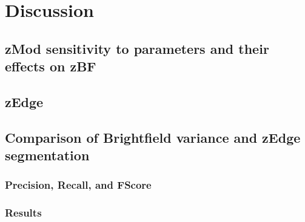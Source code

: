 
\chapter{Discussion}

\ifpdf
    \graphicspath{{Chapter6/Figs/Raster/}{Chapter6/Figs/PDF/}{Chapter6/Figs/}}
\else
    \graphicspath{{Chapter6/Figs/Vector/}{Chapter6/Figs/}}
\fi

\section[zMod sensitivity results]{zMod sensitivity to parameters and their effects on zBF}


\section{zEdge}


\section[Previous method comparison]{Comparison of Brightfield variance and zEdge segmentation}

\subsection{Precision, Recall, and FScore}

\subsection{Results}

